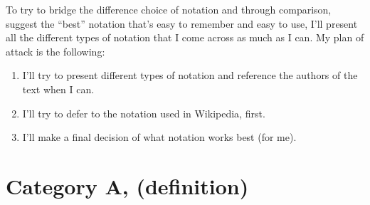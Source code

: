 \documentclass[10pt]{amsart}
\begin{document}
\begin{multicols*}{2}
To try to bridge the difference choice of notation and through comparison, suggest the ``best'' notation that's easy to remember and easy to use, I'll present all the different types of notation that I come across as much as I can. My plan of attack is the following:
\begin{enumerate}
	\item I'll try to present different types of notation and reference the authors of the text when I can.
	\item I'll try to defer to the notation used in Wikipedia, first.
	\item I'll make a final decision of what notation works best (for me).
\end{enumerate}

\section{Category $\mathbf{A}$, (definition)}


\end{multicols*}
\end{document}
